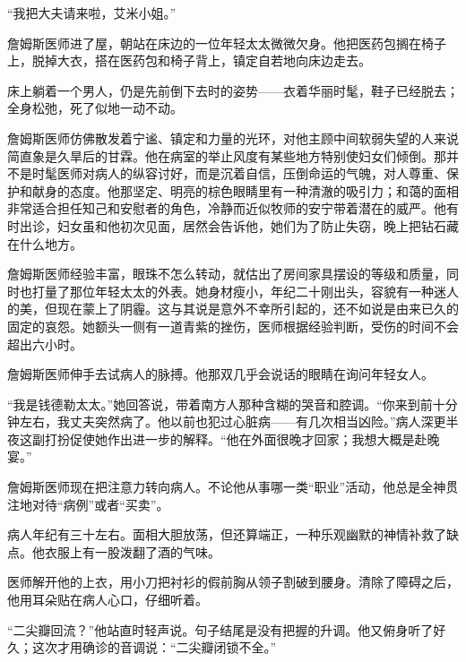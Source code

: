\documentclass{article}
\begin{document}
“我把大夫请来啦，艾米小姐。”



詹姆斯医师进了屋，朝站在床边的一位年轻太太微微欠身。他把医药包搁在椅子上，脱掉大衣，搭在医药包和椅子背上，镇定自若地向床边走去。



床上躺着一个男人，仍是先前倒下去时的姿势——衣着华丽时髦，鞋子已经脱去；全身松弛，死了似地一动不动。



詹姆斯医师仿佛散发着宁谧、镇定和力量的光环，对他主顾中间软弱失望的人来说简直象是久旱后的甘霖。他在病室的举止风度有某些地方特别使妇女们倾倒。那并不是时髦医师对病人的纵容讨好，而是沉着自信，压倒命运的气魄，对人尊重、保护和献身的态度。他那坚定、明亮的棕色眼睛里有一种清澈的吸引力；和蔼的面相非常适合担任知己和安慰者的角色，冷静而近似牧师的安宁带着潜在的威严。他有时出诊，妇女虽和他初次见面，居然会告诉他，她们为了防止失窃，晚上把钻石藏在什么地方。



詹姆斯医师经验丰富，眼珠不怎么转动，就估出了房间家具摆设的等级和质量，同时也打量了那位年轻太太的外表。她身材瘦小，年纪二十刚出头，容貌有一种迷人的美，但现在蒙上了阴霾。这与其说是意外不幸所引起的，还不如说是由来已久的固定的哀怨。她额头一侧有一道青紫的挫伤，医师根据经验判断，受伤的时间不会超出六小时。



詹姆斯医师伸手去试病人的脉搏。他那双几乎会说话的眼睛在询问年轻女人。



“我是钱德勒太太。”她回答说，带着南方人那种含糊的哭音和腔调。“你来到前十分钟左右，我丈夫突然病了。他以前也犯过心脏病——有几次相当凶险。”病人深更半夜这副打扮促使她作出进一步的解释。“他在外面很晚才回家；我想大概是赴晚宴。”



詹姆斯医师现在把注意力转向病人。不论他从事哪一类“职业”活动，他总是全神贯注地对待“病例”或者“买卖”。



病人年纪有三十左右。面相大胆放荡，但还算端正，一种乐观幽默的神情补救了缺点。他衣服上有一股泼翻了酒的气味。



医师解开他的上衣，用小刀把衬衫的假前胸从领子割破到腰身。清除了障碍之后，他用耳朵贴在病人心口，仔细听着。



“二尖瓣回流？”他站直时轻声说。句子结尾是没有把握的升调。他又俯身听了好久；这次才用确诊的音调说：“二尖瓣闭锁不全。”
\end{document}
